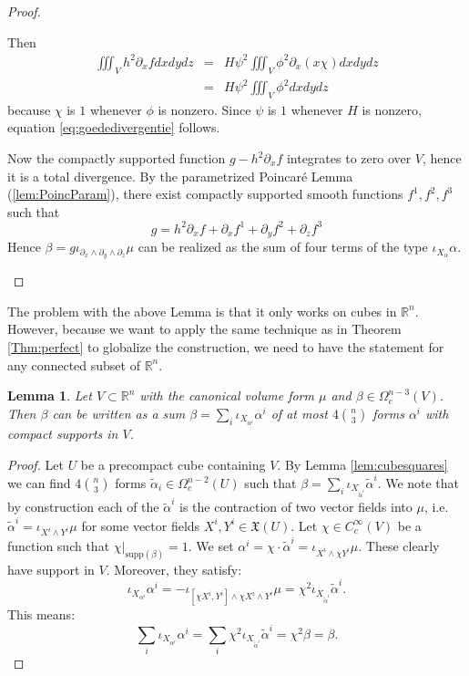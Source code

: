 \documentclass{article}
\newcommand{\supp}{\mathrm{supp}}
\newtheorem{Lemma}[Theorem]{Lemma}
\theoremstyle{definition}
\begin{document}
\begin{proof}
\begin{enumerate}
    Then 
    \begin{eqnarray*}
    \iiint_{V} h^2 \partial_xf dxdydz &=& 
    H\psi^2 \iiint_{V} \phi^2 \partial_x(x\chi) dxdydz\\
    &=& H\psi^2 \iiint_{V} \phi^2 dxdydz
    \end{eqnarray*}
    because $\chi$ is $1$ whenever $\phi$ is nonzero.
    Since $\psi$ is $1$ whenever $H$ is nonzero, equation 
    \eqref{eq:goededivergentie} follows.


Now the compactly supported function $g-h^2\partial_xf$ integrates to zero over $V$, hence it is a total divergence.
By the parametrized Poincaré Lemma (\ref{lem:PoincParam}), there exist compactly supported smooth functions $f^1,f^2,f^3$ such that
$$ 
g=h^2\partial_xf + \partial_xf^1+\partial_yf^2+\partial_zf^3
$$
Hence $\beta=g\iota_{\partial_{x}\wedge\partial_{y}\wedge\partial_{z}}\mu$ can be realized as the sum of four terms of the type $\iota_{X_\alpha}\alpha$.
\end{enumerate}
\end{proof}



The problem with the above Lemma is that it only works on cubes in $\mathbb R^n$. However, because we want to apply the same technique as in Theorem \ref{Thm:perfect} to globalize the construction, we need to have the statement for any connected subset of $\mathbb R^n$.

\begin{Lemma} \label{lem:localsquares} Let $V\subset \mathbb R^n$ with the canonical volume form $\mu$ and $\beta\in \Omega^{n-3}_c(V)$. Then $\beta$ can be written as a sum $\beta = \sum_{i}\iota_{X_{\alpha^i}}\alpha^i$  of at most $4 \binom{n}{3}$ forms $\alpha^i$ with compact supports in $V$.  
\end{Lemma}
\begin{proof}
Let $U$ be a precompact cube containing $V$. By Lemma \ref{lem:cubesquares} we can find $4 \binom{n}{3}$ forms $\tilde \alpha_i\in \Omega^{n-2}_c(U)$ such that $\beta = \sum_i\iota_{X_{\tilde \alpha^i}}\tilde \alpha^i$. We note that by construction each of the $\tilde \alpha^i$ is the contraction of two vector fields into $\mu$, i.e.  $\tilde\alpha^i=\iota_{X^i\wedge Y^i}\mu$ for some vector fields $X^i,Y^i\in \mathfrak X(U)$. Let $\chi\in C^{\infty}_c(V)$ be a function such that $\chi|_{\supp(\beta)}=1$. We set $\alpha^i=\chi\cdot \tilde\alpha^i=\iota_{X^i \wedge \chi Y^i}\mu$. These clearly have support in $V$. Moreover, they satisfy:
$$\iota_{X_{\alpha^i}}\alpha^i=-\iota_{[\chi X^i,Y^i]\wedge \chi X^i\wedge Y^i}\mu = \chi^2\iota_{X_{\tilde \alpha^i}}\tilde\alpha^i.$$
This means:
$$
\sum_i \iota_{X_{\alpha^i}}\alpha^i= \sum_i\chi^2\iota_{X_{\tilde \alpha^i}}\tilde\alpha^i=\chi^2\beta=\beta.
$$
\end{proof}
\end{document}
